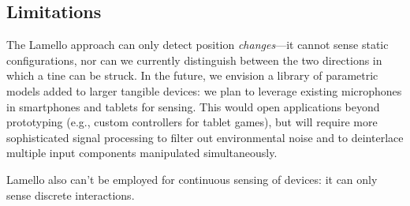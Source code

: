     \subsection{Limitations}

        The Lamello approach can only detect position \emph{changes}---it cannot sense static configurations, nor can we currently distinguish between the two directions in which a tine can be struck.  In the future, we envision a library of parametric models added to larger tangible devices: we plan to leverage existing microphones in smartphones and tablets for sensing. This would open applications beyond prototyping (e.g., custom controllers for tablet games), but will require more sophisticated signal processing to filter out environmental noise and to deinterlace multiple input components manipulated simultaneously.
        
        Lamello also can't be employed for continuous sensing of devices: it can only sense discrete interactions.